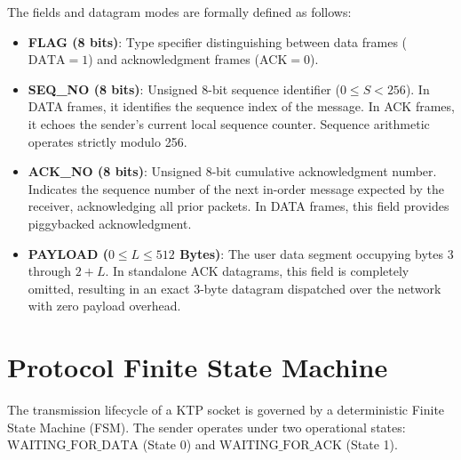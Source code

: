 \documentclass[11pt,a4paper]{article}
\begin{document}
The fields and datagram modes are formally defined as follows:
\begin{itemize}
    \item \textbf{FLAG (8 bits)}: Type specifier distinguishing between data frames ($\text{DATA} = 1$) and acknowledgment frames ($\text{ACK} = 0$).
    \item \textbf{SEQ\_NO (8 bits)}: Unsigned 8-bit sequence identifier ($0 \le S < 256$). In DATA frames, it identifies the sequence index of the message. In ACK frames, it echoes the sender's current local sequence counter. Sequence arithmetic operates strictly modulo 256.
    \item \textbf{ACK\_NO (8 bits)}: Unsigned 8-bit cumulative acknowledgment number. Indicates the sequence number of the next in-order message expected by the receiver, acknowledging all prior packets. In DATA frames, this field provides piggybacked acknowledgment.
    \item \textbf{PAYLOAD ($0 \le L \le 512$ Bytes)}: The user data segment occupying bytes 3 through $2+L$. In standalone ACK datagrams, this field is completely omitted, resulting in an exact 3-byte datagram dispatched over the network with zero payload overhead.
\end{itemize}
\section{Protocol Finite State Machine}
\label{sec:fsm}

The transmission lifecycle of a KTP socket is governed by a deterministic Finite State Machine (FSM). The sender operates under two operational states: $\text{WAITING\_FOR\_DATA}$ (State 0) and $\text{WAITING\_FOR\_ACK}$ (State 1).
\end{document}

